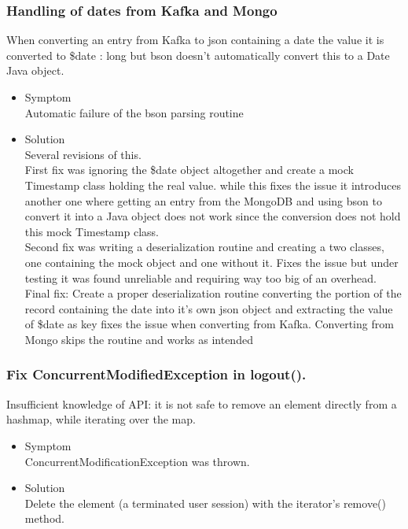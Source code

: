 \documentclass[oneside, english, final]{design}
\begin{document}
\subsubsection{Handling of dates from Kafka and Mongo}

When converting an entry from Kafka to json containing a date the value it is converted to {\$date : long} but bson doesn't automatically convert this to a Date Java object.

\begin{itemize}
      \item{Symptom
            \\
            Automatic failure of the bson parsing routine
	}
      \item{Solution
            \\
            Several revisions of this.
            \\
            First fix was ignoring the \$date object altogether and create a mock Timestamp class holding the real value. while this fixes the issue it introduces another one where getting an entry from the MongoDB and using bson to convert it into a Java object does not work since the conversion does not hold this mock Timestamp class.\\
            Second fix was writing a deserialization routine and creating a two classes, one containing the mock object and one without it. Fixes the issue but under testing it was found unreliable and requiring way too big of an overhead.\\
            Final fix: Create a proper deserialization routine converting the portion of the record containing the date into it's own json object and extracting the value of \$date as key fixes the issue when converting from Kafka. Converting from Mongo skips the routine and works as intended
            }
\end{itemize}


\subsubsection{Fix ConcurrentModifiedException in logout().}

Insufficient knowledge of API: it is not safe to remove an element directly from a hashmap, while iterating over the map.

\begin{itemize}
      \item{Symptom
            \\
            ConcurrentModificationException was thrown.
	}
      \item{Solution
            \\
            Delete the element (a terminated user session) with the iterator's remove() method.
            }
\end{itemize}
\end{document}
